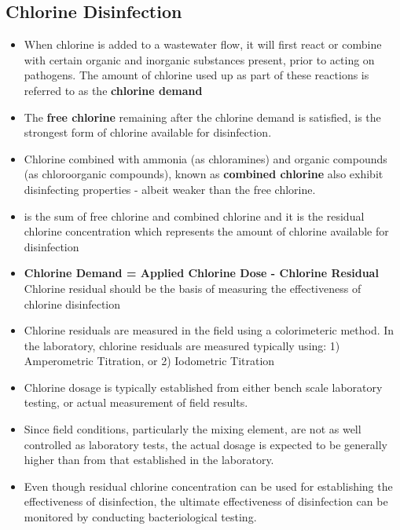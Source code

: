 \subsection{Chlorine Disinfection}

\begin{itemize}
\item When chlorine is added to a wastewater flow, it will first react or combine with certain organic and inorganic substances present, prior to acting on pathogens.  The amount of chlorine used up as part of these reactions is referred to as the \textbf{chlorine demand}\\

\item The \textbf{free chlorine} remaining after the chlorine demand is satisfied, is the strongest form of chlorine available for disinfection.  

\item Chlorine combined with ammonia (as chloramines) and organic compounds (as chloroorganic compounds), known as \textbf{combined chlorine} also exhibit disinfecting properties - albeit weaker than the free chlorine.

\item {} is the sum of free chlorine and combined chlorine and it is the residual chlorine concentration which represents the amount of chlorine available for disinfection 

\item \textbf{Chlorine Demand = Applied Chlorine Dose - Chlorine Residual}\\ Chlorine residual should be the basis of measuring the effectiveness of chlorine disinfection

\item Chlorine residuals are measured in the field using a colorimeteric method.  In the laboratory, chlorine residuals are measured typically using: 1) Amperometric Titration, or 2) Iodometric Titration

\item Chlorine dosage is typically established from either bench scale laboratory testing, or actual measurement of field results. 

\item Since field conditions, particularly the mixing element, are not as well controlled as laboratory tests, the actual dosage is expected to be generally higher than from that established in the laboratory. 

\item Even though residual chlorine concentration can be used for establishing the effectiveness of disinfection, the ultimate effectiveness of disinfection can be monitored by conducting bacteriological testing.

\end{itemize}

